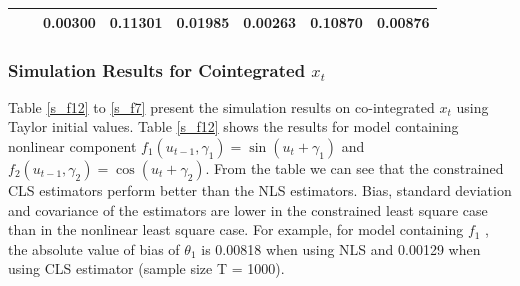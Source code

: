 \documentclass[a4paper,12pt,times,numbered,print,index]{report}
\numberwithin{equation}{section}
\begin{document}
\begin{table}[htbp]
\begin{adjustbox}{max width=\textwidth}
\begin{tabular}{cccccccccccccccc}
		&       & \multicolumn{2}{c}{\textcolor[rgb]{ .329,  .51,  .208}{0.00300}} & \multicolumn{2}{c}{\textcolor[rgb]{ .329,  .51,  .208}{0.11301}} & \multicolumn{3}{c}{\textcolor[rgb]{ .329,  .51,  .208}{0.01985}} & \multicolumn{2}{c}{\textcolor[rgb]{ .329,  .51,  .208}{0.00263}} & \multicolumn{2}{c}{\textcolor[rgb]{ .329,  .51,  .208}{0.10870}} & \multicolumn{3}{c}{\textcolor[rgb]{ .329,  .51,  .208}{0.00876}} \\
		\bottomrule
		\bottomrule
    	\end{tabular}%
	\end{adjustbox}
\label{nonco-f7}%
\end{table}%


\subsubsection{Simulation Results for Cointegrated $x_t$}
Table \ref{s_f12} to \ref{s_f7} present the simulation results on co-integrated $x_t$ using Taylor initial values.  Table \ref{s_f12} shows the results for model containing nonlinear component $f_1(u_{t-1}, \gamma_1) = \sin(u_t+\gamma_{1})$ and $f_2(u_{t-1}, \gamma_2) = \cos(u_t+\gamma_{2})$. From the table we can see that the constrained CLS estimators perform better than the NLS estimators. Bias, standard deviation and covariance of the estimators are lower in the constrained least square case than in the nonlinear least square case. For example, for model containing $f_1$ , the absolute value of bias of $\theta_1$ is 0.00818 when using NLS and 0.00129 when using CLS estimator (sample size T = 1000). 
\end{document}
